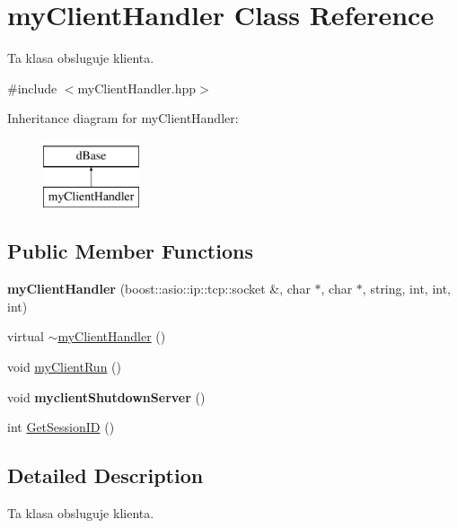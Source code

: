 \hypertarget{classmyClientHandler}{
\section{myClientHandler Class Reference}
\label{classmyClientHandler}
}


Ta klasa obsluguje klienta.  




{\ttfamily \#include $<$myClientHandler.hpp$>$}

Inheritance diagram for myClientHandler:\begin{figure}[H]
\begin{center}
\leavevmode
\includegraphics[height=2cm]{classmyClientHandler}
\end{center}
\end{figure}
\subsection*{Public Member Functions}
\begin{DoxyCompactItemize}
\item 
\hypertarget{classmyClientHandler_a17fd65171450b843b12f28b3c53c058b}{
{\bfseries myClientHandler} (boost::asio::ip::tcp::socket \&, char $\ast$, char $\ast$, string, int, int, int)}
\label{classmyClientHandler_a17fd65171450b843b12f28b3c53c058b}

\item 
virtual \hyperlink{classmyClientHandler_a20a6d3fcd1d40b107df3b508872e4342}{$\sim$myClientHandler} ()
\item 
void \hyperlink{classmyClientHandler_ab189bfb1e7dba2f101a187161bd03e4d}{myClientRun} ()
\item 
\hypertarget{classmyClientHandler_a0cb77a19ccda06ae987490dec1e98a69}{
void {\bfseries myclientShutdownServer} ()}
\label{classmyClientHandler_a0cb77a19ccda06ae987490dec1e98a69}

\item 
int \hyperlink{classmyClientHandler_a9a158082b71de6585113cfbad406ddf5}{GetSessionID} ()
\end{DoxyCompactItemize}


\subsection{Detailed Description}
Ta klasa obsluguje klienta. 

